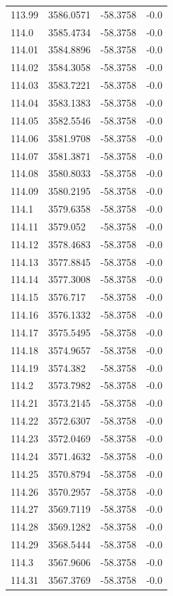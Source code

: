 \begin{table}[H]
\begin{tabular}{llll}
113.99 & 3586.0571 & -58.3758 & -0.0 \\
114.0 & 3585.4734 & -58.3758 & -0.0 \\
114.01 & 3584.8896 & -58.3758 & -0.0 \\
114.02 & 3584.3058 & -58.3758 & -0.0 \\
114.03 & 3583.7221 & -58.3758 & -0.0 \\
114.04 & 3583.1383 & -58.3758 & -0.0 \\
114.05 & 3582.5546 & -58.3758 & -0.0 \\
114.06 & 3581.9708 & -58.3758 & -0.0 \\
114.07 & 3581.3871 & -58.3758 & -0.0 \\
114.08 & 3580.8033 & -58.3758 & -0.0 \\
114.09 & 3580.2195 & -58.3758 & -0.0 \\
114.1 & 3579.6358 & -58.3758 & -0.0 \\
114.11 & 3579.052 & -58.3758 & -0.0 \\
114.12 & 3578.4683 & -58.3758 & -0.0 \\
114.13 & 3577.8845 & -58.3758 & -0.0 \\
114.14 & 3577.3008 & -58.3758 & -0.0 \\
114.15 & 3576.717 & -58.3758 & -0.0 \\
114.16 & 3576.1332 & -58.3758 & -0.0 \\
114.17 & 3575.5495 & -58.3758 & -0.0 \\
114.18 & 3574.9657 & -58.3758 & -0.0 \\
114.19 & 3574.382 & -58.3758 & -0.0 \\
114.2 & 3573.7982 & -58.3758 & -0.0 \\
114.21 & 3573.2145 & -58.3758 & -0.0 \\
114.22 & 3572.6307 & -58.3758 & -0.0 \\
114.23 & 3572.0469 & -58.3758 & -0.0 \\
114.24 & 3571.4632 & -58.3758 & -0.0 \\
114.25 & 3570.8794 & -58.3758 & -0.0 \\
114.26 & 3570.2957 & -58.3758 & -0.0 \\
114.27 & 3569.7119 & -58.3758 & -0.0 \\
114.28 & 3569.1282 & -58.3758 & -0.0 \\
114.29 & 3568.5444 & -58.3758 & -0.0 \\
114.3 & 3567.9606 & -58.3758 & -0.0 \\
114.31 & 3567.3769 & -58.3758 & -0.0 \\

\end{tabular}
\end{table}
